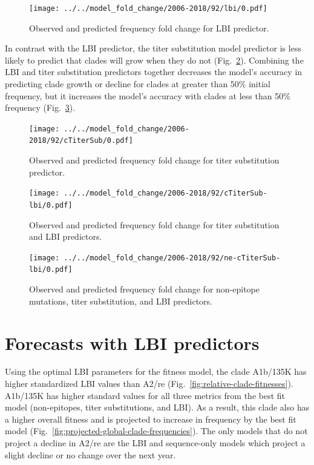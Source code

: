 \documentclass[12pt]{article}
\begin{document}
\begin{figure}
\texttt{[image: ../../model\_fold\_change/2006-2018/92/lbi/0.pdf]}
\caption{\label{fig:model-fold-change-lbi}Observed and predicted frequency fold change for LBI predictor.}
\end{figure}

In contrast with the LBI predictor, the titer substitution model predictor is less likely to predict that clades will grow when they do not (Fig.~\ref{fig:model-fold-change-cTiterSub}).
Combining the LBI and titer substitution predictors together decreases the model's accuracy in predicting clade growth or decline for clades at greater than 50\% initial frequency, but it increases the model's accuracy with clades at less than 50\% frequency (Fig.~\ref{fig:model-fold-change-cTiterSub-lbi}).

\begin{figure}
\texttt{[image: ../../model\_fold\_change/2006-2018/92/cTiterSub/0.pdf]}
\caption{\label{fig:model-fold-change-cTiterSub}Observed and predicted frequency fold change for titer substitution predictor.}
\end{figure}

\begin{figure}
\texttt{[image: ../../model\_fold\_change/2006-2018/92/cTiterSub-lbi/0.pdf]}
\caption{\label{fig:model-fold-change-cTiterSub-lbi}Observed and predicted frequency fold change for titer substitution and LBI predictors.}
\end{figure}

\begin{figure}
\texttt{[image: ../../model\_fold\_change/2006-2018/92/ne-cTiterSub-lbi/0.pdf]}
\caption{\label{fig:model-fold-change-ne-cTiterSub-lbi}Observed and predicted frequency fold change for non-epitope mutations, titer substitution, and LBI predictors.}
\end{figure}

\section{Forecasts with LBI predictors}

Using the optimal LBI parameters for the fitness model, the clade A1b/135K has higher standardized LBI values than A2/re (Fig.~\ref{fig:relative-clade-fitnesses}).
A1b/135K has higher standard values for all three metrics from the best fit model (non-epitopes, titer substitutions, and LBI).
As a result, this clade also has a higher overall fitness and is projected to increase in frequency by the best fit model (Fig.~\ref{fig:projected-global-clade-frequencies}).
The only models that do not project a decline in A2/re are the LBI and sequence-only models which project a slight decline or no change over the next year.
\end{document}
